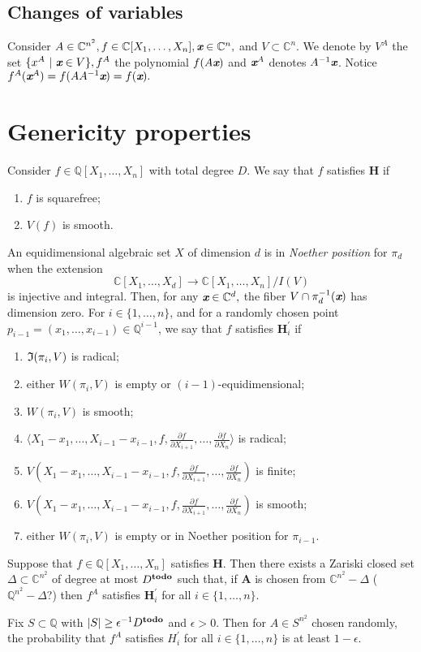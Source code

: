 \documentclass[sigconf]{acmart}
\def\td{{\bf todo}}
\def\xb{\textit{\textbf{x}}}
\def\C{\mathbb{C}}
\def\Q{\mathbb{Q}}
\def\pa{\partial}
\def\D{\Delta}
\def\I{\frak{I}}
\begin{document}
\subsection{Changes of variables}
%
Consider $A \in \C^{n^2}, f \in \C[X_1,\hdots,X_n], \textit{\textbf{x}} \in \mathbb{C}^n,$ and $V \subset \C^n$. We denote by 
$V^A$ the set $\{x^A~|~\xb \in V\}, f^A$ the polynomial $f(A \xb)$ and $\xb^A$ denotes $A^{-1}\xb$. Notice $f^A(\xb^A) = f(A A^{-1}\xb)=f(\xb).$
%
%
%
%
%
%
%
%
\section{Genericity properties}
%
Consider $f \in \mathbb{Q}[X_1,\hdots,X_n]$ with total degree $D$.  
We say that $f$ satisfies $\textbf{H}$ if 
%
\begin{enumerate}
    \item $f$ is squarefree;
    \item $V(f)$ is smooth.
\end{enumerate}
%
An equidimensional algebraic set $X$ of dimension $d$ is in \textit{Noether position} for $\pi_d$ when the extension 
\[
\C[X_1,\hdots,X_d] \rightarrow \C[X_1,\hdots,X_n]/I(V)
\] 
is injective and integral.  Then, for any $\xb \in \C^d,$ the fiber 
$V \cap \pi_d^{-1}(\xb)$ has dimension zero. For $i\in\{1,\hdots,n\}$, and for a randomly chosen point $p_{i-1} = (x_1,\hdots,x_{i-1}) \in \Q^{i-1}$, we say that $f$ satisfies $\textbf{H}_i^{'}$ if 
%
\begin{enumerate}
\item $\I(\pi_i,V)$ is radical;
\item either $W(\pi_i,V)$ is empty or $(i-1)$-equidimensional;
\item $W(\pi_i,V)$ is smooth;
\item $\langle X_1-x_1,\hdots,X_{i-1}-x_{i-1}, f,  \frac{\pa f}{\pa X_{i+1}},\hdots,\frac{\pa f}{\pa X_n}\rangle $ is radical; 
\item $V(X_1-x_1,\hdots,X_{i-1}-x_{i-1}, f,  \frac{\pa f}{\pa X_{i+1}},\hdots,\frac{\pa f}{\pa X_n})$ is finite;
\item $V(X_1-x_1,\hdots,X_{i-1}-x_{i-1}, f,  \frac{\pa f}{\pa X_{i+1}},\hdots,\frac{\pa f}{\pa X_n})$ is smooth;
\item either $W(\pi_i,V)$ is empty or in Noether position for $\pi_{i-1}$.
\end{enumerate}
%
\begin{theorem}
Suppose that $f \in \Q[X_1,\hdots,X_n]$ satisfies \textbf{H}. Then there exists a Zariski closed set $\D \subset \mathbb{C}^{n^2}$ of degree at most $D^{\textrm{\td}}$ such that, if $\textbf{A}$ is chosen from  $\C^{n^2}-\Delta$ ( $\Q^{n^2}-\Delta$?) then $f^A$ satisfies $\textbf{H}_i^{'}$ for all $i \in \{1,\hdots,n\}.$
\end{theorem}
%
\begin{corollary} 
Fix $S \subset \mathbb{Q}$ with $|S| \geq \epsilon^{-1} D^{\textrm{\td}}$ and $\epsilon > 0$. Then for $A\in S^{n^2}$ chosen randomly, the probability that $f^A$ satisfies $H_i^{'}$ for all $i \in \{1,\hdots,n\}$ is at least $1-\epsilon.$
\end{corollary}
%
%
%
%
\end{document}

